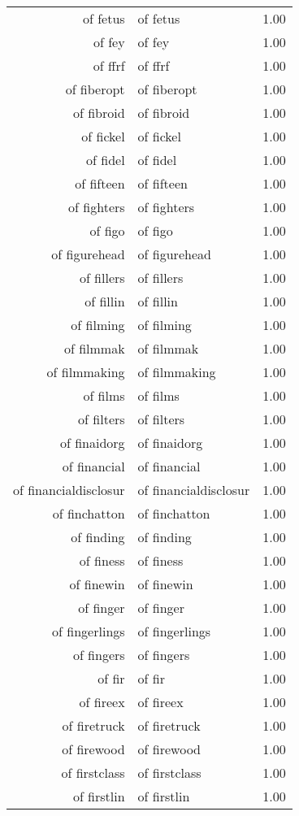 \begin{table}[ht]
\begin{tabular}{rlr}
  of fetus & of fetus & 1.00 \\ 
  of fey & of fey & 1.00 \\ 
  of ffrf & of ffrf & 1.00 \\ 
  of fiberopt & of fiberopt & 1.00 \\ 
  of fibroid & of fibroid & 1.00 \\ 
  of fickel & of fickel & 1.00 \\ 
  of fidel & of fidel & 1.00 \\ 
  of fifteen & of fifteen & 1.00 \\ 
  of fighters & of fighters & 1.00 \\ 
  of figo & of figo & 1.00 \\ 
  of figurehead & of figurehead & 1.00 \\ 
  of fillers & of fillers & 1.00 \\ 
  of fillin & of fillin & 1.00 \\ 
  of filming & of filming & 1.00 \\ 
  of filmmak & of filmmak & 1.00 \\ 
  of filmmaking & of filmmaking & 1.00 \\ 
  of films & of films & 1.00 \\ 
  of filters & of filters & 1.00 \\ 
  of finaidorg & of finaidorg & 1.00 \\ 
  of financial & of financial & 1.00 \\ 
  of financialdisclosur & of financialdisclosur & 1.00 \\ 
  of finchatton & of finchatton & 1.00 \\ 
  of finding & of finding & 1.00 \\ 
  of finess & of finess & 1.00 \\ 
  of finewin & of finewin & 1.00 \\ 
  of finger & of finger & 1.00 \\ 
  of fingerlings & of fingerlings & 1.00 \\ 
  of fingers & of fingers & 1.00 \\ 
  of fir & of fir & 1.00 \\ 
  of fireex & of fireex & 1.00 \\ 
  of firetruck & of firetruck & 1.00 \\ 
  of firewood & of firewood & 1.00 \\ 
  of firstclass & of firstclass & 1.00 \\ 
  of firstlin & of firstlin & 1.00 \\ 

\end{tabular}
\end{table}
